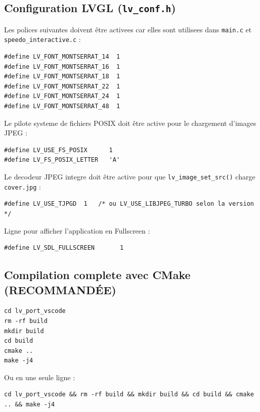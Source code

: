 \documentclass[a4paper,11pt]{article}
\begin{document}
\subsection{Configuration LVGL (\texttt{lv\_conf.h})}

Les polices suivantes doivent être activees car elles sont utilisees dans
\texttt{main.c} et \texttt{speedo\_interactive.c} :

\begin{lstlisting}[style=confcode,caption={lv\_conf.h --- polices a activer}]
#define LV_FONT_MONTSERRAT_14  1
#define LV_FONT_MONTSERRAT_16  1
#define LV_FONT_MONTSERRAT_18  1
#define LV_FONT_MONTSERRAT_22  1
#define LV_FONT_MONTSERRAT_24  1
#define LV_FONT_MONTSERRAT_48  1
\end{lstlisting}

Le pilote systeme de fichiers POSIX doit être active pour le chargement d'images JPEG :

\begin{lstlisting}[style=confcode]
#define LV_USE_FS_POSIX      1
#define LV_FS_POSIX_LETTER   'A'
\end{lstlisting}

Le decodeur JPEG integre doit être active pour que \texttt{lv\_image\_set\_src()} charge
\texttt{cover.jpg} :

\begin{lstlisting}[style=confcode]
#define LV_USE_TJPGD  1   /* ou LV_USE_LIBJPEG_TURBO selon la version */
\end{lstlisting}

Ligne pour afficher l'application en Fullscreen :

\begin{lstlisting}[style=confcode]
#define LV_SDL_FULLSCREEN       1
\end{lstlisting}


\subsection{Compilation complete avec CMake (RECOMMANDÉE)}

\begin{lstlisting}[style=bashcode]
cd lv_port_vscode
rm -rf build
mkdir build
cd build
cmake ..
make -j4
\end{lstlisting}

Ou en une seule ligne :

\begin{lstlisting}[style=bashcode]
cd lv_port_vscode && rm -rf build && mkdir build && cd build && cmake .. && make -j4
\end{lstlisting}
\end{document}

